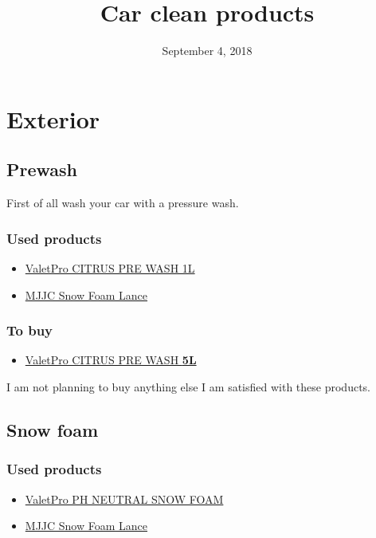 \documentclass[12pt, a4paper, portrait]{article}
\title{\textbf{Car clean products}}
\date{September 4, 2018}
\begin{document}
\maketitle
\newpage

\tableofcontents
\newpage
\section{Exterior}
\subsection{Prewash}
First of all wash your car with a pressure wash.
\subsubsection{Used products}
\begin{itemize}
\item{\href{https://www.valetpro.eu/Foams-and-PreWashes/27-/Citrus-Pre-Wash}{ValetPro CITRUS PRE WASH 1L}}
\item{\href{https://www.aliexpress.com/store/product/New-Foam-Lance-For-skil/803552_32480648531.html}{MJJC Snow Foam Lance}}
\end{itemize}
\subsubsection{To buy}
\begin{itemize}
\item{\href{https://www.valetpro.eu/Foams-and-PreWashes/27-/Citrus-Pre-Wash}{ValetPro CITRUS PRE WASH \textbf{5L}}}
\end{itemize}
I am not planning to buy anything else I am satisfied with these products.

\subsection{Snow foam}
\subsubsection{Used products}
\begin{itemize}
\item{\href{https://www.valetpro.eu/Foams-and-PreWashes/34-/pH-Neutral-Snow-Foam}{ValetPro PH NEUTRAL SNOW FOAM}}
\item{\href{https://www.aliexpress.com/store/product/New-Foam-Lance-For-skil/803552_32480648531.html}{MJJC Snow Foam Lance}}
\end{itemize}
\end{document}
